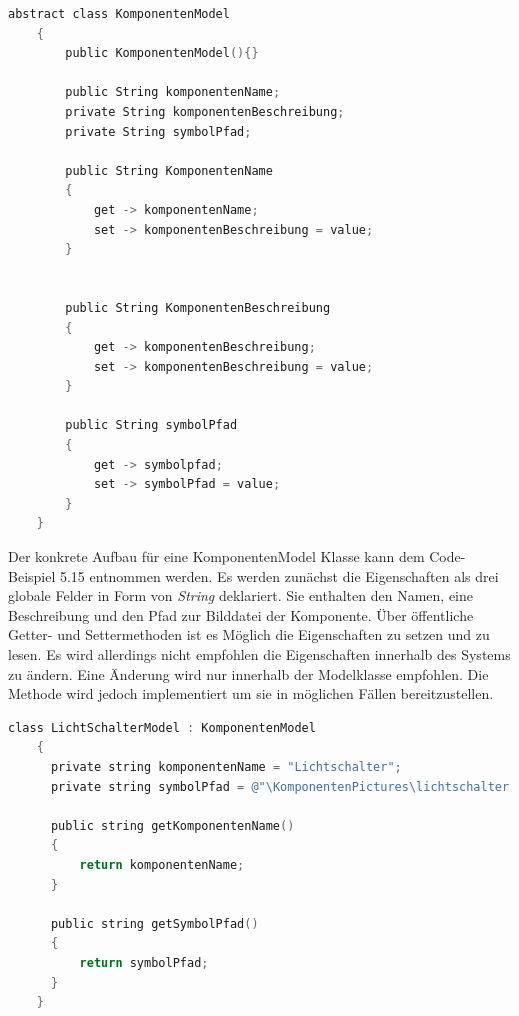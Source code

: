 \begin{lstlisting}[language=C,
    frame=single,           % Ein Rahmen um den Code
    framexleftmargin=15pt,  % Rahmen link von den Zahlen
    style=algoBericht,
    label={KomponentenModel},
    captionpos=b,           % Caption unter den Code setzen
    caption={KomponentenModel}]
    abstract class KomponentenModel
    {
        public KomponentenModel(){}

        public String komponentenName;
        private String komponentenBeschreibung;
        private String symbolPfad;

        public String KomponentenName
        {
            get -> komponentenName;
            set -> komponentenBeschreibung = value;
        }


        public String KomponentenBeschreibung
        {
            get -> komponentenBeschreibung;
            set -> komponentenBeschreibung = value;
        }

        public String symbolPfad
        {
            get -> symbolpfad;
            set -> symbolPfad = value;
        }
    }
\end{lstlisting}
Der konkrete Aufbau für eine KomponentenModel Klasse kann dem Code-Beispiel 5.15 entnommen werden. Es werden zunächst die Eigenschaften als drei globale Felder in Form von \textit{String} deklariert. Sie enthalten den Namen, eine Beschreibung und den Pfad zur Bilddatei der Komponente. Über öffentliche Getter- und Settermethoden ist es Möglich die Eigenschaften zu setzen und zu lesen. Es wird allerdings nicht empfohlen die Eigenschaften innerhalb des Systems zu ändern. Eine Änderung wird nur innerhalb der Modelklasse empfohlen. Die Methode wird jedoch implementiert um sie in möglichen Fällen bereitzustellen. 
\pagebreak
\begin{lstlisting}[language=C,
    frame=single,           % Ein Rahmen um den Code
    framexleftmargin=15pt,  % Rahmen link von den Zahlen
    style=algoBericht,
    label={KomponentenModel},
    captionpos=b,           % Caption unter den Code setzen
    caption={KomponentenModel}]
    class LichtSchalterModel : KomponentenModel
    {
      private string komponentenName = "Lichtschalter";
      private string symbolPfad = @"\KomponentenPictures\lichtschalter.png";

      public string getKomponentenName()
      {
          return komponentenName;
      }

      public string getSymbolPfad()
      {
          return symbolPfad;
      }
    }
\end{lstlisting}
